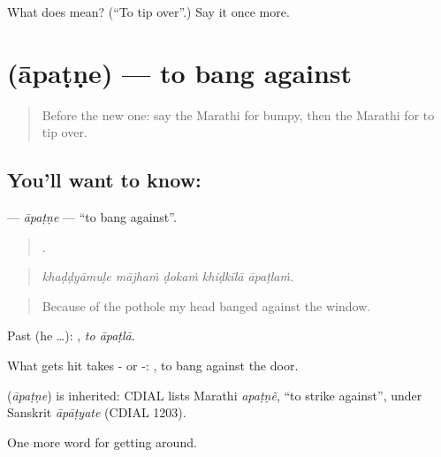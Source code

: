 \begin{tcolorbox}[breakable,colback=teal!4,colframe=teal!35!black,title={Before you move on}]
What does  mean? (\textquotedblleft{}To tip over\textquotedblright{}.) Say it once more.
\end{tcolorbox}
\section[\texorpdfstring{\mr{आपटणे} (āpaṭṇe)}{आपटणे (āpaṭṇe)}]{ (āpaṭṇe) — to bang against}

\label{lesson:MR-C403-apatne}



\begin{quote}
Before the new one: say the Marathi for bumpy, then the Marathi for to tip over.
\end{quote}

\subsection*{You'll want to know: }
\textbf{} — \emph{āpaṭṇe} — \textquotedblleft{}to bang against\textquotedblright{}.

\begin{quote}
    .
\end{quote}

\begin{quote}
\emph{khaḍḍyāmuḷe mājhaṁ ḍokaṁ khiḍkīlā āpaṭlaṁ.}
\end{quote}

\begin{quote}
Because of the pothole my head banged against the window.
\end{quote}

Past (he …):  , \emph{to āpaṭlā}.

What gets hit takes - or -:  , to bang against the door.

\begin{cousinweb}
\textbf{} (\emph{āpaṭṇe}) is inherited: CDIAL lists Marathi \emph{apaṭṇẽ}, \textquotedblleft{}to strike against\textquotedblright{}, under Sanskrit \emph{āpāṭyate} (CDIAL 1203).
\end{cousinweb}

\begin{grammarlens}[title={What you've built}]
One more word for getting around.
\end{grammarlens}

